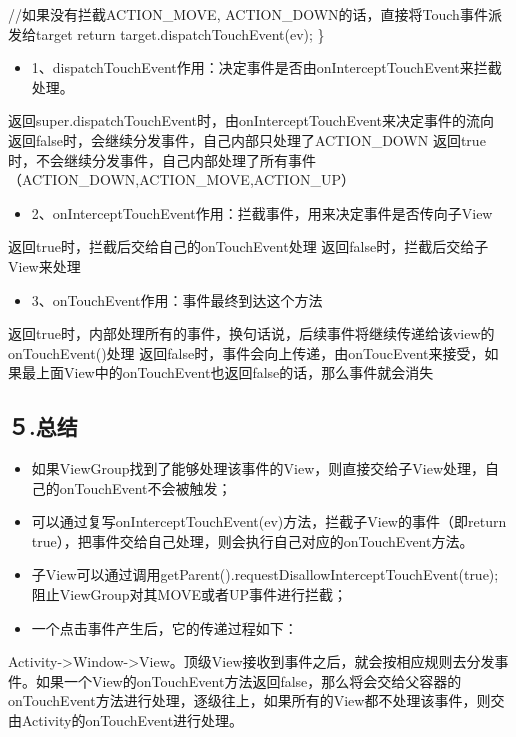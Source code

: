 \documentclass[9pt, b5paper]{article}
\begin{document}
    //如果没有拦截ACTION\_MOVE, ACTION\_DOWN的话，直接将Touch事件派发给target  
    return target.dispatchTouchEvent(ev);  
\}
\begin{itemize}
\item 1、dispatchTouchEvent作用：决定事件是否由onInterceptTouchEvent来拦截处理。
\end{itemize}
返回super.dispatchTouchEvent时，由onInterceptTouchEvent来决定事件的流向
返回false时，会继续分发事件，自己内部只处理了ACTION\_DOWN
返回true时，不会继续分发事件，自己内部处理了所有事件（ACTION\_DOWN,ACTION\_MOVE,ACTION\_UP）

\begin{itemize}
\item 2、onInterceptTouchEvent作用：拦截事件，用来决定事件是否传向子View
\end{itemize}
返回true时，拦截后交给自己的onTouchEvent处理
返回false时，拦截后交给子View来处理

\begin{itemize}
\item 3、onTouchEvent作用：事件最终到达这个方法
\end{itemize}
返回true时，内部处理所有的事件，换句话说，后续事件将继续传递给该view的onTouchEvent()处理
返回false时，事件会向上传递，由onToucEvent来接受，如果最上面View中的onTouchEvent也返回false的话，那么事件就会消失
\subsection{５.总结}
\label{sec-12-5}
\begin{itemize}
\item 如果ViewGroup找到了能够处理该事件的View，则直接交给子View处理，自己的onTouchEvent不会被触发；　

\item 可以通过复写onInterceptTouchEvent(ev)方法，拦截子View的事件（即return true），把事件交给自己处理，则会执行自己对应的onTouchEvent方法。
\item 子View可以通过调用getParent().requestDisallowInterceptTouchEvent(true);  阻止ViewGroup对其MOVE或者UP事件进行拦截；　　

\item 一个点击事件产生后，它的传递过程如下：
\end{itemize}
Activity->Window->View。顶级View接收到事件之后，就会按相应规则去分发事件。如果一个View的onTouchEvent方法返回false，那么将会交给父容器的onTouchEvent方法进行处理，逐级往上，如果所有的View都不处理该事件，则交由Activity的onTouchEvent进行处理。　
\end{document}
